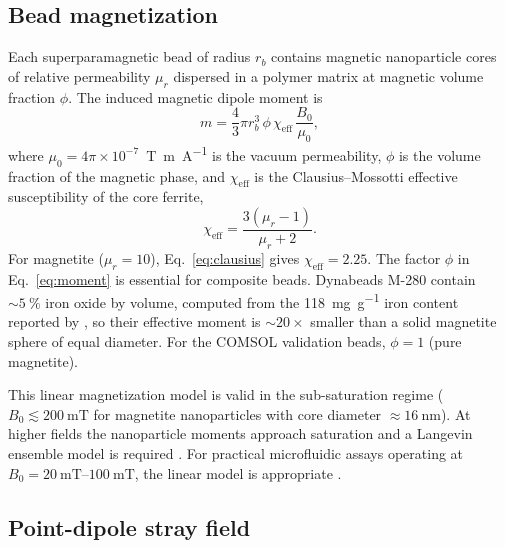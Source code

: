 \documentclass[pdflatex,sn-basic]{sn-jnl}
\theoremstyle{thmstyleone}
\theoremstyle{thmstyletwo}
\theoremstyle{thmstylethree}
\begin{document}
\subsection{Bead magnetization}\label{sec:magnetization}

Each superparamagnetic bead of radius $r_b$ contains magnetic nanoparticle cores of relative permeability $\mu_r$ dispersed in a polymer matrix at magnetic volume fraction $\phi$. The induced magnetic dipole moment is
\begin{equation}
m = \frac{4}{3}\pi r_b^3 \, \phi \, \chi_{\text{eff}} \, \frac{B_0}{\mu_0},
\label{eq:moment}
\end{equation}
where $\mu_0 = 4\pi \times 10^{-7}$~\si{\tesla\meter\per\ampere} is the vacuum permeability, $\phi$ is the volume fraction of the magnetic phase, and $\chi_{\text{eff}}$ is the Clausius--Mossotti effective susceptibility of the core ferrite,
\begin{equation}
\chi_{\text{eff}} = \frac{3(\mu_r - 1)}{\mu_r + 2}.
\label{eq:clausius}
\end{equation}
For magnetite ($\mu_r = 10$), Eq.~\eqref{eq:clausius} gives $\chi_{\text{eff}} = 2.25$. The factor $\phi$ in Eq.~\eqref{eq:moment} is essential for composite beads. Dynabeads M-280 contain ${\sim}\SI{5}{\percent}$ iron oxide by volume, computed from the \SI{118}{\milli\gram\per\gram} iron content reported by \citet{fonnum2005}, so their effective moment is ${\sim}20\times$ smaller than a solid magnetite sphere of equal diameter. For the COMSOL validation beads, $\phi = 1$ (pure magnetite).

This linear magnetization model is valid in the sub-saturation regime ($B_0 \lesssim \SI{200}{\milli\tesla}$ for magnetite nanoparticles with core diameter ${\approx}\SI{16}{\nano\meter}$). At higher fields the nanoparticle moments approach saturation and a Langevin ensemble model is required \citep{elfimova2019,henrard2019}. For practical microfluidic assays operating at $B_0 = \SIrange{20}{100}{\milli\tesla}$, the linear model is appropriate \citep{ota2019}.

\subsection{Point-dipole stray field}\label{sec:strayfield}
\end{document}
